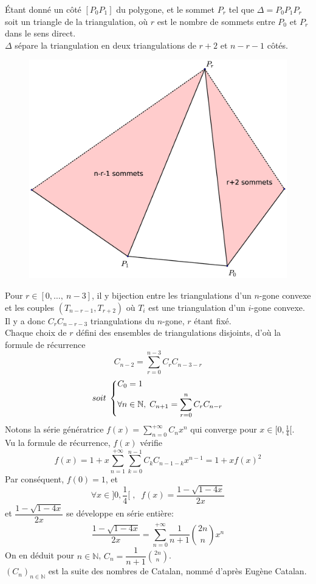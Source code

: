 \documentclass[10pt,a4paper]{article}
\begin{document}
			Étant donné un côté $[P_{0}P_{1}]$ du polygone, et le sommet $P_{r}$ tel que $\Delta = P_{0}P_{1}P_{r}$ soit un triangle de la triangulation, où $r$ est le nombre de sommets entre $P_{0}$ et $P_{r}$ dans le sens direct.\\
			$\Delta$ sépare la triangulation en deux triangulations de $r+2$ et $n-r-1$ côtés.\\
			\begin{figure}[h]
				\centering
				\includegraphics[scale=0.2]{nombres_catalan.eps}
			\end{figure}
			Pour $r\in [0,\ldots,\:n-3]$, il y bijection entre les triangulations d'un $n$-gone convexe et les couples $(T_{n-r-1},T_{r+2})$ où $T_{i}$ est une triangulation d'un $i$-gone convexe.\\
			Il y a donc $C_{r}C_{n-r-3}$ triangulations du $n$-gone, $r$ étant fixé.\\
			Chaque choix de $r$ défini des ensembles de triangulations disjoints, d'où la formule de récurrence
			\[C_{n-2} = \sum_{r=0}^{n-3}{C_{r}C_{n-3-r}}\] 
			\[soit\;
				\begin{dcases*}
		        C_{0} = 1\\
		        \forall n\in\mathbb{N},\; C_{n+1} = \sum_{r=0}^{n}{C_{r}C_{n-r}}
		        \end{dcases*}
			\]
			Notons la série génératrice $f(x) = \sum\limits_{n=0}^{+\infty}{C_{n}x^{n}}$ qui converge pour $x\in[0,\frac{1}{4}[$.\\
			Vu la formule de récurrence, $f(x)$ vérifie
			$$f(x) = 1+x\sum_{n=1}^{+\infty}{\sum_{k=0}^{n-1}{C_{k}C_{n-1-k}x^{n-1}}} = 1+xf(x)^{2}$$
			Par conséquent, $f(0)=1$, et $$\forall x\in]0,\frac{1}{4}[\;,\;\;
			f(x) = \dfrac{1-\sqrt{1-4x}}{2x}$$
			et $\dfrac{1-\sqrt{1-4x}}{2x}$ se développe en série entière:
			$$\dfrac{1-\sqrt{1-4x}}{2x} = \sum_{n=0}^{+\infty}{\dfrac{1}{n+1}\binom{2n}{n}x^{n}}$$
			On en déduit pour $n\in\mathbb{N}$, $C_{n} = \dfrac{1}{n+1}\displaystyle\binom{2n}{n}$.\\
			$(C_{n})_{n\in\mathbb{N}}$ est la suite des nombres de Catalan, nommé d'après Eugène Catalan.
			
\end{document}
